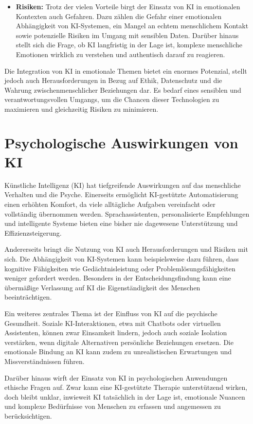 \documentclass[a4paper,12pt]{article}
\begin{document}
\begin{itemize}
\item \textbf{Risiken:}  
Trotz der vielen Vorteile birgt der Einsatz von KI in emotionalen Kontexten auch Gefahren. Dazu zählen die Gefahr einer emotionalen Abhängigkeit von KI-Systemen, ein Mangel an echtem menschlichem Kontakt sowie potenzielle Risiken im Umgang mit sensiblen Daten. Darüber hinaus stellt sich die Frage, ob KI langfristig in der Lage ist, komplexe menschliche Emotionen wirklich zu verstehen und authentisch darauf zu reagieren.
\end{itemize}

Die Integration von KI in emotionale Themen bietet ein enormes Potenzial, stellt jedoch auch Herausforderungen in Bezug auf Ethik, Datenschutz und die Wahrung zwischenmenschlicher Beziehungen dar. Es bedarf eines sensiblen und verantwortungsvollen Umgangs, um die Chancen dieser Technologien zu maximieren und gleichzeitig Risiken zu minimieren.

\section{Psychologische Auswirkungen von KI}

Künstliche Intelligenz (KI) hat tiefgreifende Auswirkungen auf das menschliche Verhalten und die Psyche. Einerseits ermöglicht KI-gestützte Automatisierung einen erhöhten Komfort, da viele alltägliche Aufgaben vereinfacht oder vollständig übernommen werden. Sprachassistenten, personalisierte Empfehlungen und intelligente Systeme bieten eine bisher nie dagewesene Unterstützung und Effizienzsteigerung.

Andererseits bringt die Nutzung von KI auch Herausforderungen und Risiken mit sich. Die Abhängigkeit von KI-Systemen kann beispielsweise dazu führen, dass kognitive Fähigkeiten wie Gedächtnisleistung oder Problemlösungsfähigkeiten weniger gefordert werden. Besonders in der Entscheidungsfindung kann eine übermäßige Verlassung auf KI die Eigenständigkeit des Menschen beeinträchtigen.

Ein weiteres zentrales Thema ist der Einfluss von KI auf die psychische Gesundheit. Soziale KI-Interaktionen, etwa mit Chatbots oder virtuellen Assistenten, können zwar Einsamkeit lindern, jedoch auch soziale Isolation verstärken, wenn digitale Alternativen persönliche Beziehungen ersetzen. Die emotionale Bindung an KI kann zudem zu unrealistischen Erwartungen und Missverständnissen führen.

Darüber hinaus wirft der Einsatz von KI in psychologischen Anwendungen ethische Fragen auf. Zwar kann eine KI-gestützte Therapie unterstützend wirken, doch bleibt unklar, inwieweit KI tatsächlich in der Lage ist, emotionale Nuancen und komplexe Bedürfnisse von Menschen zu erfassen und angemessen zu berücksichtigen.
\end{document}

